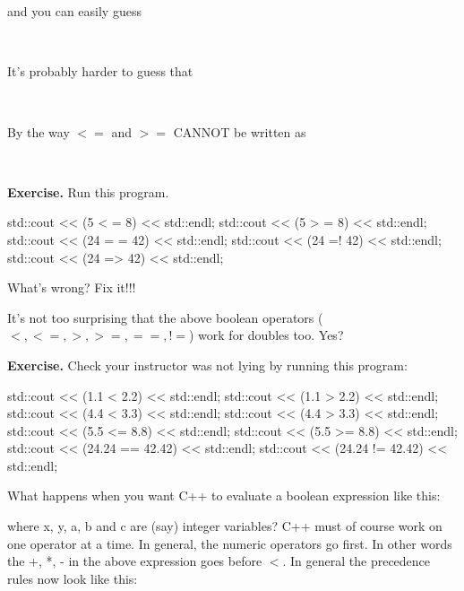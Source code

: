 {\\
\\

and you can easily guess

\\

It's probably harder to guess that

\\

By the way $<=$ and $>=$ CANNOT be written as

\\

\textbf{Exercise.} Run this program.
\begin{console}
std::cout << (5 < = 8) << std::endl;
std::cout << (5 > = 8) << std::endl;
std::cout << (24 = = 42) << std::endl;
std::cout << (24 =! 42) << std::endl;
std::cout << (24 => 42) << std::endl;
\end{console}
What's wrong? Fix it!!!


It's not too surprising that the above boolean operators ($<, <=, >, >=, ==, !=$) work for doubles too. Yes?

\textbf{Exercise.} Check your instructor was not lying by running this program:
\begin{console}
std::cout << (1.1 < 2.2) << std::endl;
std::cout << (1.1 > 2.2) << std::endl;
std::cout << (4.4 < 3.3) << std::endl;
std::cout << (4.4 > 3.3) << std::endl;
std::cout << (5.5 <= 8.8) << std::endl;
std::cout << (5.5 >= 8.8) << std::endl;
std::cout << (24.24 == 42.42) << std::endl;
std::cout << (24.24 != 42.42) << std::endl;
\end{console}


What happens when you want C++ to evaluate a boolean expression like
this:

where x, y, a, b and c are (say) integer variables? C++ must of course
work on one operator at a time. In general, the numeric operators go first.
In other words the +, *, - in the above expression goes before $<$.
In general the precedence rules now look like this:

}
